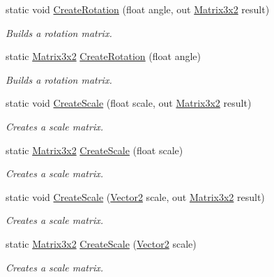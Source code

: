 \begin{DoxyCompactItemize}
\item 
static void \hyperlink{struct_open_t_k_1_1_matrix3x2_aa5d0aaa8af413bb39861e00662e06501}{Create\-Rotation} (float angle, out \hyperlink{struct_open_t_k_1_1_matrix3x2}{Matrix3x2} result)
\begin{DoxyCompactList}\small\item\em Builds a rotation matrix. \end{DoxyCompactList}\item 
static \hyperlink{struct_open_t_k_1_1_matrix3x2}{Matrix3x2} \hyperlink{struct_open_t_k_1_1_matrix3x2_a5e4e9462d061274fce795d4a15a16dbc}{Create\-Rotation} (float angle)
\begin{DoxyCompactList}\small\item\em Builds a rotation matrix. \end{DoxyCompactList}\item 
static void \hyperlink{struct_open_t_k_1_1_matrix3x2_a63e571f416606ee31fd8eb99773051c7}{Create\-Scale} (float scale, out \hyperlink{struct_open_t_k_1_1_matrix3x2}{Matrix3x2} result)
\begin{DoxyCompactList}\small\item\em Creates a scale matrix. \end{DoxyCompactList}\item 
static \hyperlink{struct_open_t_k_1_1_matrix3x2}{Matrix3x2} \hyperlink{struct_open_t_k_1_1_matrix3x2_a9b717dffcfb0a33dd51b907d9b01c11e}{Create\-Scale} (float scale)
\begin{DoxyCompactList}\small\item\em Creates a scale matrix. \end{DoxyCompactList}\item 
static void \hyperlink{struct_open_t_k_1_1_matrix3x2_a71febf28d56bc559558ac0f8f3059557}{Create\-Scale} (\hyperlink{struct_open_t_k_1_1_vector2}{Vector2} scale, out \hyperlink{struct_open_t_k_1_1_matrix3x2}{Matrix3x2} result)
\begin{DoxyCompactList}\small\item\em Creates a scale matrix. \end{DoxyCompactList}\item 
static \hyperlink{struct_open_t_k_1_1_matrix3x2}{Matrix3x2} \hyperlink{struct_open_t_k_1_1_matrix3x2_a8869b285f38edb2d3e9cdc66333f61b6}{Create\-Scale} (\hyperlink{struct_open_t_k_1_1_vector2}{Vector2} scale)
\begin{DoxyCompactList}\small\item\em Creates a scale matrix. \end{DoxyCompactList}\item 

\end{DoxyCompactItemize}
